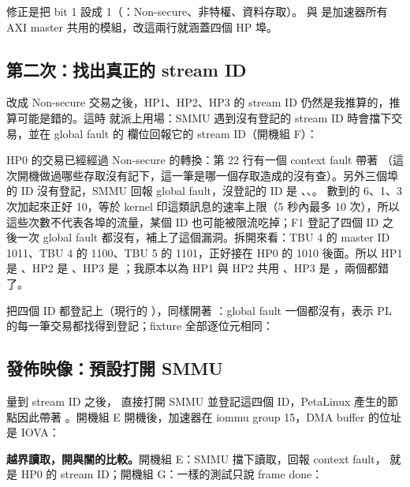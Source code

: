 
修正是把 bit 1 設成 1（：Non-secure、非特權、資料存取）。 與  是加速器所有 AXI master 共用的模組，改這兩行就涵蓋四個 HP 埠。

\subsection{第二次：找出真正的 stream ID}

改成 Non-secure 交易之後，HP1、HP2、HP3 的 stream ID 仍然是我推算的，推算可能是錯的。這時  就派上用場：SMMU 遇到沒有登記的 stream ID 時會擋下交易，並在 global fault 的  欄位回報它的 stream ID（開機組 F）：


HP0 的交易已經經過 Non-secure 的轉換：第 22 行有一個 context fault 帶著 （這次開機做過哪些存取沒有記下，這一筆是哪一個存取造成的沒有查）。另外三個埠的 ID 沒有登記，SMMU 回報 global fault，沒登記的 ID 是 、、。 數到的 6、1、3 次加起來正好 10，等於 kernel 印這類訊息的速率上限（5 秒內最多 10 次），所以這些次數不代表各埠的流量，某個 ID 也可能被限流吃掉；F1 登記了四個 ID 之後一次 global fault 都沒有，補上了這個漏洞。拆開來看：TBU 4 的 master ID 1011、TBU 4 的 1100、TBU 5 的 1101，正好接在 HP0 的 1010 後面。所以 HP1 是 、HP2 是 、HP3 是 ；我原本以為 HP1 與 HP2 共用 、HP3 是 ，兩個都錯了。

把四個 ID 都登記上（現行的 ），同樣開著 ：global fault 一個都沒有，表示 PL 的每一筆交易都找得到登記；fixture 全部逐位元相同：


\subsection{發佈映像：預設打開 SMMU}

量到 stream ID 之後， 直接打開 SMMU 並登記這四個 ID，PetaLinux 產生的節點因此帶著 。開機組 E 開機後，加速器在 iommu group 15，DMA buffer 的位址是 IOVA：


\textbf{越界讀取，開與關的比較。}開機組 E：SMMU 擋下讀取，回報 context fault， 就是 HP0 的 stream ID；開機組 G：一樣的測試只說 frame done：

